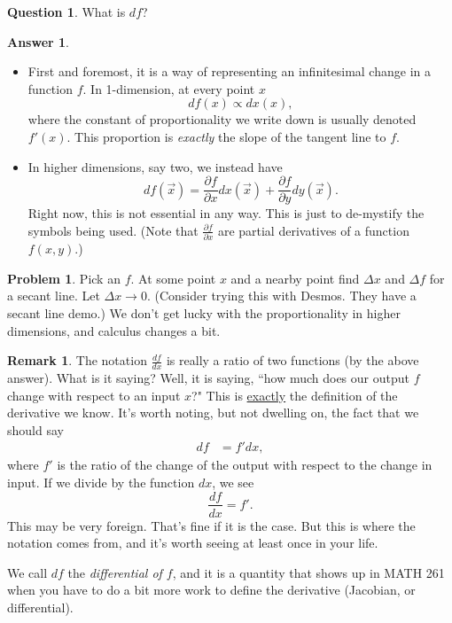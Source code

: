 \documentclass[12pt]{article}
\theoremstyle{definition}
\newtheorem{remark}{Remark}[section]
\newtheorem{problem}{Problem}[section]
\newtheorem{question}{Question}[section]
\newtheorem{answer}{Answer}[section]
\begin{document}
\begin{question}
What is $df$?
\end{question}

\begin{answer}~
\begin{itemize}
    \item First and foremost, it is a way of representing an infinitesimal change in a function $f$. In 1-dimension, at every point $x$
    \[
    df(x)\propto dx(x),
    \]
    where the constant of proportionality we write down is usually denoted $f'(x)$. This proportion is \emph{exactly} the slope of the tangent line to $f$.
    
    \item In higher dimensions, say two, we instead have
    \[
    df(\vec{x}) = \frac{\partial f}{\partial x}dx(\vec{x})+\frac{\partial f}{\partial y}dy(\vec{x}).
    \]
    Right now, this is not essential in any way.  This is just to de-mystify the symbols being used. (Note that $\frac{\partial f}{\partial x}$ are partial derivatives of a function $f(x,y)$.)
\end{itemize}
\end{answer}

\begin{problem}
Pick an $f$. At some point $x$ and a nearby point find $\Delta x$ and $\Delta f$ for a secant line. Let $\Delta x \to 0$. (Consider trying this with Desmos. They have a secant line demo.) We don't get lucky with the proportionality in higher dimensions, and calculus changes a bit.
\end{problem}

\begin{remark}
The notation $\frac{df}{dx}$ is really a ratio of two functions (by the above answer).  What is it saying?  Well, it is saying, ``how much does our output $f$ change with respect to an input $x$?" This is \underline{exactly} the definition of the derivative we know.  It's worth noting, but not dwelling on, the fact that we should say
\begin{align*}
    df&=f'dx,
\end{align*}
where $f'$ is the ratio of the change of the output with respect to the change in input.  If we divide by the function $dx$, we see
\[
\frac{df}{dx}=f'.
\]
This may be very foreign.  That's fine if it is the case. But this is where the notation comes from, and it's worth seeing at least once in your life.  

We call $df$ the \emph{differential of $f$}, and it is a quantity that shows up in MATH 261 when you have to do a bit more work to define the derivative (Jacobian, or differential).
\end{remark}
\end{document}
